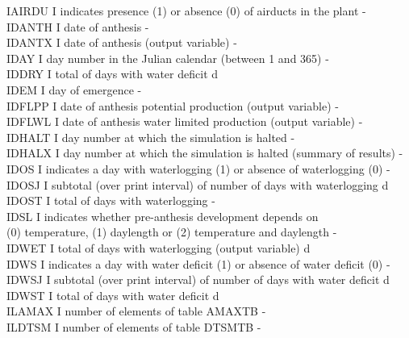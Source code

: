 \begin{tabbing}
IAIRDU\> \> I\> indicates presence (1) or absence (0) of airducts in the plant\> \> \> \> \> \> \> -\\
IDANTH\> \> I\> date of anthesis\> \> \> \> \> \> \> -\\
IDANTX\> \> I\> date of anthesis (output variable)\> \> \> \> \> \> \> -\\
IDAY    \> \> I   \> day number in the Julian calendar (between 1 and 365)        \> \> \> \> \> \> \> -\\
IDDRY\> \> I\> total of days with water deficit\> \> \> \> \> \> \> d\\
IDEM\> \> I\> day of emergence\> \> \> \> \> \> \> -\\
IDFLPP\> \> I\> date of anthesis potential production (output variable)\> \> \> \> \> \> \> -\\
IDFLWL\> \> I\> date of anthesis water limited production (output variable)\> \> \> \> \> \> \> -\\
IDHALT\> \> I\> day number at which the simulation is halted\> \> \> \> \> \> \> -\\
IDHALX\> \> I\> day number at which the simulation is halted (summary of results)\> \> \> \> \> \> \> -\\
IDOS\> \> I\> indicates a day with waterlogging (1) or absence of waterlogging (0)\> \> \> \> \> \> \> -\\
IDOSJ\> \> I\> subtotal (over print interval) of number of days with waterlogging\> \> \> \> \> \> \> d\\
IDOST\> \> I\> total of days with waterlogging\> \> \> \> \> \> \> -\\
IDSL\> \> I\> indicates whether pre-anthesis development depends on \\
\>\> \> (0) temperature, (1) daylength or (2) temperature and daylength\> \> \> \> \> \> \> -\\
IDWET\> \> I\> total of days with waterlogging (output variable)\> \> \> \> \> \> \> d\\
IDWS\> \> I\> indicates a day with water deficit (1) or absence of water deficit (0)\> \> \> \> \> \> \> -\\
IDWSJ\> \> I\> subtotal (over print interval) of number of days with water deficit\> \> \> \> \> \> \> d\\
IDWST\> \> I\> total of days with water deficit\> \> \> \> \> \> \> d\\
ILAMAX\> \> I\> number of elements of table AMAXTB\> \> \> \> \> \> \> -\\
ILDTSM\> \> I\> number of elements of table DTSMTB\> \> \> \> \> \> \> -\\

\end{tabbing}
